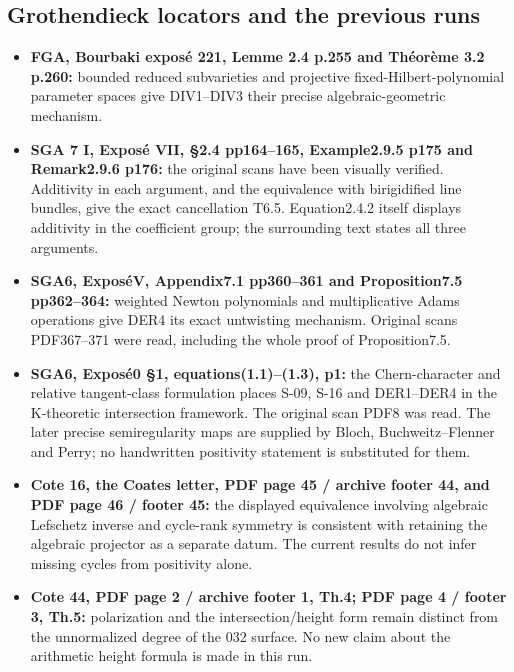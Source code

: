 \documentclass[11pt,a4paper]{article}
\providecommand{\tightlist}{\setlength{\itemsep}{0pt}\setlength{\parskip}{0pt}}
\theoremstyle{definition}
\begin{document}
\subsection{Grothendieck locators and the previous
runs}\label{IMPLICATIONS-grothendieck-locators-and-the-previous-runs}

\begin{itemize}
\tightlist
\item
  \textbf{FGA, Bourbaki exposé 221, Lemme 2.4 p.255 and Théorème 3.2
  p.260:} bounded reduced subvarieties and projective
  fixed-Hilbert-polynomial parameter spaces give DIV1--DIV3 their
  precise algebraic-geometric mechanism.
\item
  \textbf{SGA 7 I, Exposé VII, §2.4 pp164--165, Example2.9.5 p175 and
  Remark2.9.6 p176:} the original scans have been visually verified.
  Additivity in each argument, and the equivalence with birigidified
  line bundles, give the exact cancellation T6.5. Equation2.4.2 itself
  displays additivity in the coefficient group; the surrounding text
  states all three arguments.
\item
  \textbf{SGA6, ExposéV, Appendix7.1 pp360--361 and Proposition7.5
  pp362--364:} weighted Newton polynomials and multiplicative Adams
  operations give DER4 its exact untwisting mechanism. Original scans
  PDF367--371 were read, including the whole proof of Proposition7.5.
\item
  \textbf{SGA6, Exposé0 §1, equations(1.1)--(1.3), p1:} the
  Chern-character and relative tangent-class formulation places S-09,
  S-16 and DER1--DER4 in the K-theoretic intersection framework. The
  original scan PDF8 was read. The later precise semiregularity maps are
  supplied by Bloch, Buchweitz--Flenner and Perry; no handwritten
  positivity statement is substituted for them.
\item
  \textbf{Cote 16, the Coates letter, PDF page 45 / archive footer 44,
  and PDF page 46 / footer 45:} the displayed equivalence involving
  algebraic Lefschetz inverse and cycle-rank symmetry is consistent with
  retaining the algebraic projector as a separate datum. The current
  results do not infer missing cycles from positivity alone.
\item
  \textbf{Cote 44, PDF page 2 / archive footer 1, Th.4; PDF page 4 /
  footer 3, Th.5:} polarization and the intersection/height form remain
  distinct from the unnormalized degree of the 032 surface. No new claim
  about the arithmetic height formula is made in this run.
\end{itemize}
\end{document}
